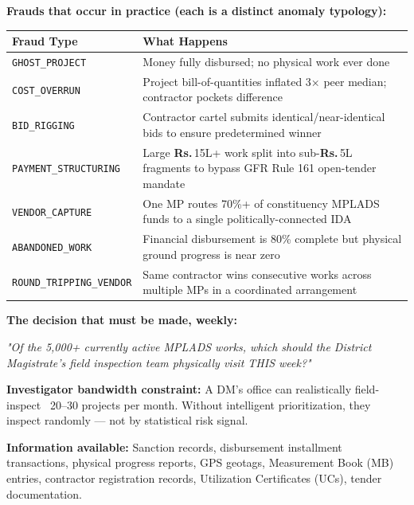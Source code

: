 \documentclass[11pt,a4paper]{article}
\DeclareRobustCommand{\INR}{\textbf{Rs.\,}}
\DeclareRobustCommand{\INR}{₹}
\begin{document}
\textbf{Frauds that occur in practice (each is a distinct anomaly typology):}

\begin{table}[htbp]
\centering
\small
\begin{tabularx}{\textwidth}{l Y}
\toprule
\textbf{Fraud Type} & \textbf{What Happens} \\
\midrule
\texttt{GHOST\_PROJECT} & Money fully disbursed; no physical work ever done \\
\texttt{COST\_OVERRUN} & Project bill-of-quantities inflated 3× peer median; contractor pockets difference \\
\texttt{BID\_RIGGING} & Contractor cartel submits identical/near-identical bids to ensure predetermined winner \\
\texttt{PAYMENT\_STRUCTURING} & Large \INR{}15L+ work split into sub-\INR{}5L fragments to bypass GFR Rule 161 open-tender mandate \\
\texttt{VENDOR\_CAPTURE} & One MP routes 70\%+ of constituency MPLADS funds to a single politically-connected IDA \\
\texttt{ABANDONED\_WORK} & Financial disbursement is 80\% complete but physical ground progress is near zero \\
\texttt{ROUND\_TRIPPING\_VENDOR} & Same contractor wins consecutive works across multiple MPs in a coordinated arrangement \\
\bottomrule
\end{tabularx}
\end{table}


\textbf{The decision that must be made, weekly:}
\begin{tcolorbox}[colback=blue!4!white,colframe=blue!60!black,arc=1.5mm,boxrule=0.7pt,left=8pt,right=8pt,top=6pt,bottom=6pt]
\textit{"Of the 5,000+ currently active MPLADS works, which should the District Magistrate's field inspection team physically visit THIS week?"}\\
\end{tcolorbox}

\textbf{Investigator bandwidth constraint:} A DM's office can realistically field-inspect ~20–30 projects per month. Without intelligent prioritization, they inspect randomly --- not by statistical risk signal.

\textbf{Information available:} Sanction records, disbursement installment transactions, physical progress reports, GPS geotags, Measurement Book (MB) entries, contractor registration records, Utilization Certificates (UCs), tender documentation.
\end{document}
